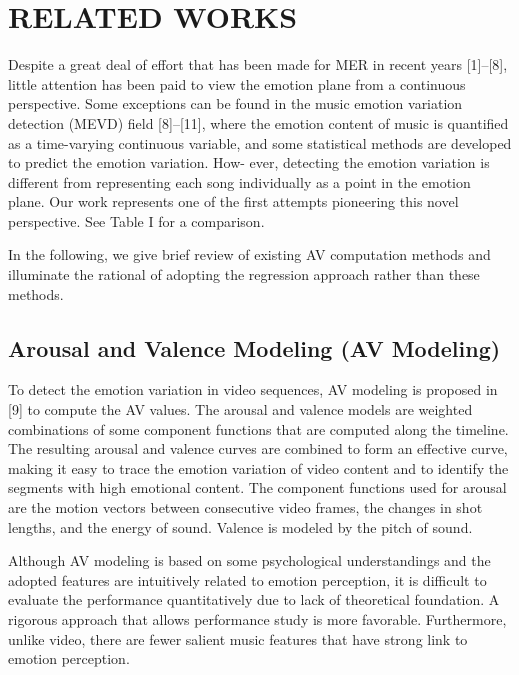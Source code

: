 \documentclass[journal, twoside]{IEEEtran}
\begin{document}
\section{RELATED WORKS}
Despite a great deal of effort that has been made for MER in
recent years [1]–[8], little attention has been paid to view the
emotion plane from a continuous perspective. Some exceptions
can be found in the music emotion variation detection (MEVD)
field [8]–[11], where the emotion content of music is quantified as a time-varying continuous variable, and some statistical
methods are developed to predict the emotion variation. How-
ever, detecting the emotion variation is different from representing each song individually as a point in the emotion plane.
Our work represents one of the first attempts pioneering this
novel perspective. See Table I for a comparison.

In the following, we give brief review of existing AV computation methods and illuminate the rational of adopting the regression approach rather than these methods.

\subsection{Arousal and Valence Modeling (AV Modeling)}
To detect the emotion variation in video sequences, AV modeling is proposed in [9] to compute the AV values. The arousal and valence models are weighted combinations of some component functions that are computed along the timeline. The resulting arousal and valence curves are combined to form an effective curve, making it easy to trace the emotion variation of video content and to identify the segments with high emotional
content. The component functions used for arousal are the motion vectors between consecutive video frames, the changes in shot lengths, and the energy of sound. Valence is modeled by the pitch of sound.

Although AV modeling is based on some psychological understandings and the adopted features are intuitively related to emotion perception, it is difficult to evaluate the performance quantitatively due to lack of theoretical foundation. A rigorous approach that allows performance study is more favorable. Furthermore, unlike video, there are fewer salient music features that have strong link to emotion perception.
\end{document}
